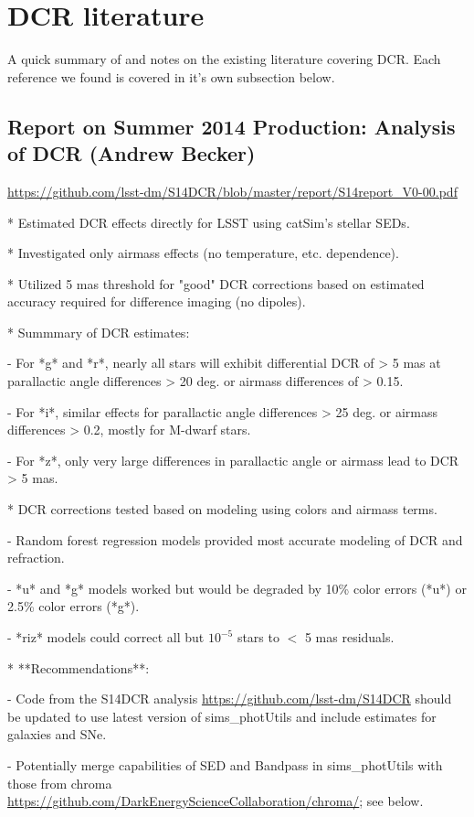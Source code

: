 \documentclass[]{article}
\begin{document}
\section{DCR literature}
A quick summary of and notes on the existing literature covering DCR. Each reference we found is covered in it's own subsection below.

\subsection{Report on Summer 2014 Production: Analysis of DCR (Andrew Becker)}

\url{https://github.com/lsst-dm/S14DCR/blob/master/report/S14report_V0-00.pdf}

* Estimated DCR effects directly for LSST using catSim's stellar
SEDs.

* Investigated only airmass effects (no temperature, etc. dependence).

* Utilized 5 mas threshold for "good" DCR corrections based on estimated accuracy required for difference imaging (no dipoles).

* Summmary of DCR estimates:

- For *g* and *r*, nearly all stars will exhibit differential DCR of > 5 mas at parallactic angle differences > 20 deg. or airmass differences of > 0.15.

- For *i*, similar effects for parallactic angle differences > 25 deg. or airmass differences > 0.2, mostly for M-dwarf stars.

- For *z*, only very large differences in parallactic angle or airmass lead to DCR > 5 mas.

* DCR corrections tested based on modeling using colors and airmass terms.

- Random forest regression models provided most accurate modeling of DCR and refraction.

- *u* and *g* models worked but would be degraded by 10\% color errors (*u*) or 2.5\% color errors (*g*).

- *riz* models could correct all but $10^{-5}$ stars to $<$ 5 mas residuals.

* **Recommendations**:

- Code from the S14DCR analysis \url{https://github.com/lsst-dm/S14DCR} should be updated to use latest version of sims\_photUtils and include estimates for galaxies and SNe.

- Potentially merge capabilities of SED and Bandpass in sims\_photUtils with those from chroma \url{https://github.com/DarkEnergyScienceCollaboration/chroma/}; see below.
\end{document}
